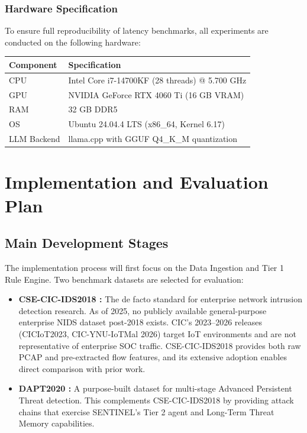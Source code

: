 \documentclass[12pt,a4paper]{article}
\begin{document}
\subsubsection{Hardware Specification}
To ensure full reproducibility of latency benchmarks, all experiments are conducted on the following hardware:

\begin{table}[H]
    \centering
    \begin{tabular}{ll}
        \toprule
        \textbf{Component} & \textbf{Specification}                         \\
        \midrule
        CPU                & Intel Core i7-14700KF (28 threads) @ 5.700 GHz \\
        GPU                & NVIDIA GeForce RTX 4060 Ti (16 GB VRAM)        \\
        RAM                & 32 GB DDR5                                     \\
        OS                 & Ubuntu 24.04.4 LTS (x86\_64, Kernel 6.17)      \\
        LLM Backend        & llama.cpp with GGUF Q4\_K\_M quantization      \\
        \bottomrule
    \end{tabular}
\end{table}

\newpage
\section{Implementation and Evaluation Plan}

\subsection{Main Development Stages}
The implementation process will first focus on the Data Ingestion and Tier 1 Rule Engine. Two benchmark datasets are selected for evaluation:

\begin{itemize}
    \item \textbf{CSE-CIC-IDS2018 \cite{sharafaldin2018}:} The de facto standard for enterprise network intrusion detection research. As of 2025, no publicly available general-purpose enterprise NIDS dataset post-2018 exists. CIC's 2023--2026 releases (CICIoT2023, CIC-YNU-IoTMal 2026) target IoT environments and are not representative of enterprise SOC traffic. CSE-CIC-IDS2018 provides both raw PCAP and pre-extracted flow features, and its extensive adoption enables direct comparison with prior work.
    \item \textbf{DAPT2020 \cite{dapt2020}:} A purpose-built dataset for multi-stage Advanced Persistent Threat detection. This complements CSE-CIC-IDS2018 by providing attack chains that exercise SENTINEL's Tier 2 agent and Long-Term Threat Memory capabilities.
\end{itemize}
\end{document}
